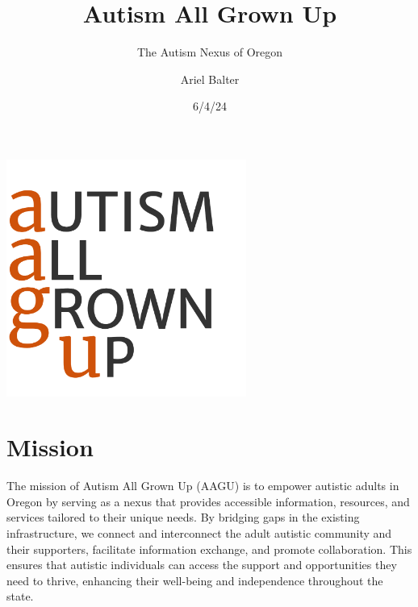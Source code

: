 \documentclass[
  letterpaper,
  DIV=11,
  numbers=noendperiod]{scrreprt}
\title{Autism All Grown Up}
\subtitle{The Autism Nexus of Oregon}
\author{Ariel Balter}
\date{6/4/24}
\renewcommand*\contentsname{Table of contents}
\newcommand\contentsname{Table of contents}
\begin{document}
\maketitle
\ifdefined\Shaded\renewenvironment{Shaded}{\begin{tcolorbox}[breakable, frame hidden, borderline west={3pt}{0pt}{shadecolor}, interior hidden, sharp corners, enhanced, boxrule=0pt]}{\end{tcolorbox}}\fi

\renewcommand*\contentsname{Contents}
{
\hypersetup{linkcolor=}
\setcounter{tocdepth}{1}
\tableofcontents
}

\hypertarget{section}{%
\chapter{}\label{section}}

\includegraphics[width=3.09896in,height=3.05923in]{././media/image4.png}


\hypertarget{sec-mission}{%
\chapter{Mission}\label{sec-mission}}

The mission of Autism All Grown Up (AAGU) is to empower autistic adults
in Oregon by serving as a nexus that provides accessible information,
resources, and services tailored to their unique needs. By bridging gaps
in the existing infrastructure, we connect and interconnect the adult
autistic community and their supporters, facilitate information
exchange, and promote collaboration. This ensures that autistic
individuals can access the support and opportunities they need to
thrive, enhancing their well-being and independence throughout the
state.
\end{document}
